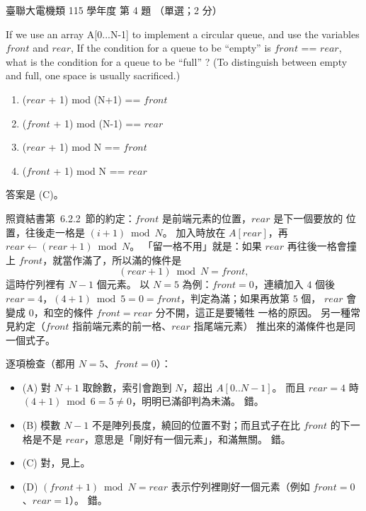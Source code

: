\begin{pastexam}[label={px:ust-115-ee-ds-04}]{臺聯大電機類 115 學年度 第 4 題}
（單選；2 分）

If we use an array A[0...N-1] to implement a circular queue, and use the variables $\mathit{front}$
and $\mathit{rear}$, If the condition for a queue to be ``empty'' is $\mathit{front}$ ==
$\mathit{rear}$, what is the condition for a queue to be ``full'' ? (To distinguish between empty
and full, one space is usually sacrificed.)
\begin{enumerate}[label=(\Alph*)]
\item ($\mathit{rear}$ + 1) mod (N+1) == $\mathit{front}$
\item ($\mathit{front}$ + 1) mod (N-1) == $\mathit{rear}$
\item ($\mathit{rear}$ + 1) mod N == $\mathit{front}$
\item ($\mathit{front}$ + 1) mod N == $\mathit{rear}$
\end{enumerate}
\end{pastexam}

\begin{pastsoln}
答案是 (C)。

照資結書第~6.2.2~節的約定：$\mathit{front}$ 是前端元素的位置，$\mathit{rear}$ 是下一個要放的
位置，往後走一格是 $(i + 1) \bmod N$。 加入時放在 $A[\mathit{rear}]$，再
$\mathit{rear} \gets (\mathit{rear} + 1) \bmod N$。 「留一格不用」就是：如果 $\mathit{rear}$
再往後一格會撞上 $\mathit{front}$，就當作滿了，所以滿的條件是
\[
(\mathit{rear} + 1) \bmod N = \mathit{front},
\]
這時佇列裡有 $N - 1$ 個元素。 以 $N = 5$ 為例：$\mathit{front} = 0$，連續加入 $4$ 個後
$\mathit{rear} = 4$，$(4 + 1) \bmod 5 = 0 = \mathit{front}$，判定為滿；如果再放第 $5$ 個，
$\mathit{rear}$ 會變成 $0$，和空的條件 $\mathit{front} = \mathit{rear}$ 分不開，這正是要犧牲
一格的原因。 另一種常見約定（$\mathit{front}$ 指前端元素的前一格、$\mathit{rear}$ 指尾端元素）
推出來的滿條件也是同一個式子。

逐項檢查（都用 $N = 5$、$\mathit{front} = 0$）：
\begin{itemize}
\item (A) 對 $N + 1$ 取餘數，索引會跑到 $N$，超出 $A[0..N-1]$。 而且 $\mathit{rear} = 4$ 時
$(4 + 1) \bmod 6 = 5 \ne 0$，明明已滿卻判為未滿。 錯。
\item (B) 模數 $N - 1$ 不是陣列長度，繞回的位置不對；而且式子在比 $\mathit{front}$ 的下一格是不是
$\mathit{rear}$，意思是「剛好有一個元素」，和滿無關。 錯。
\item (C) 對，見上。
\item (D) $(\mathit{front} + 1) \bmod N = \mathit{rear}$ 表示佇列裡剛好一個元素（例如
$\mathit{front} = 0$、$\mathit{rear} = 1$）。 錯。
\end{itemize}
\end{pastsoln}
